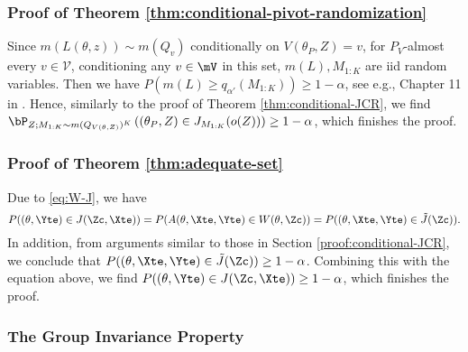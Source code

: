 \documentclass[english]{article}
\begin{document}
\subsubsection{Proof of Theorem \ref{thm:conditional-pivot-randomization}}\label{proof:conditional-pivot-randomization}

Since $m(L(\theta,z))\sim m(Q_v)$ conditionally on $V(\theta_P,Z)=v$, 
for $P_V$-almost every $v \in \mathcal{V}$, 
conditioning any $v \in \mV$ in this set, 
$m(L),M_{1:K}$ are iid random variables. 
Then we have $P(m(L) \ge q_{\alpha'}(M_{1:K})) \ge 1- \alpha$,
see e.g., Chapter 11 in \cite{vovk2022algorithmic}. Hence, similarly to the proof of Theorem \ref{thm:conditional-JCR}, 
we find
$\bP_{Z;M_{1:K} \sim m(Q_{V(\theta,Z)})^K}\left((\theta_P,Z) \in J_{M_{1:K}}(o(Z))\right) \ge 1 - \alpha$,
which finishes the proof.
    

\subsubsection{Proof of Theorem \ref{thm:adequate-set}}\label{proof:adequate-set}

Due to \eqref{eq:W-J}, 
we have $$P((\theta,\Yte) \in J(\Zc,\Xte)) = P(A(\theta,\Xte,\Yte) \in W(\theta,\Zc)) = P((\theta,\Xte,\Yte) \in \tilde{J}(\Zc)).$$
 In addition, from arguments similar to those in Section \ref{proof:conditional-JCR}, we conclude that $P((\theta,\Xte,\Yte) \in \tilde{J}(\Zc)) \ge 1-\alpha$. Combining this with the equation above, we find 
 $P((\theta,\Yte) \in J(\Zc,\Xte))\ge 1-\alpha$, which finishes the proof.



\subsubsection{The Group Invariance Property}\label{sec:uniform}

\end{document}
